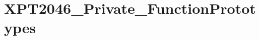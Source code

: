 \hypertarget{group___x_p_t2046___private___function_prototypes}{}\section{X\+P\+T2046\+\_\+\+Private\+\_\+\+Function\+Prototypes}
\label{group___x_p_t2046___private___function_prototypes}

